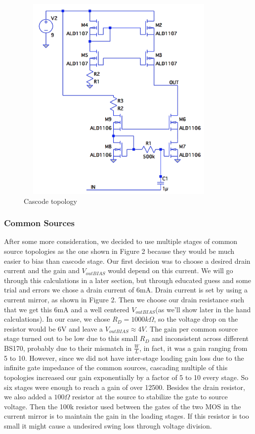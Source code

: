 \documentclass[11pt, twoside, letterpaper]{article}
\begin{document}
\begin{figure}[htbp]
\begin{center}
\includegraphics[width=4in,height=4in]{Cascode.png}
\caption{Cascode topology}
\end{center}
\end{figure}
\FloatBarrier

\subsubsection{Common Sources}
After some more consideration, we decided to use multiple stages of common source topologies as the one shown in Figure 2 because they would 
be much easier to bias than cascode stage. Our first decision was to choose a desired drain current and the gain and $V_{outBIAS}$
would depend on this current. We will go through this calculations in a later section, but through educated guess and some trial and errors we 
chose a drain current of 6mA. Drain current is set by using a current mirror, as shown in Figure 2. Then we choose our drain 
resistance such that we get this 6mA and a well centered $V_{outBIAS}$(as we'll show later in the hand calculations). In our case, we chose 
$R_D=1000k\Omega$, so the voltage drop on the resistor would be 6V and leave a $V_{outBIAS}\approx 4V$. The gain per common source stage turned 
out to be low due to this small $R_D$ and inconsistent across different BS170, probably due to their mismatch in $\frac{W}{L}$, in fact, it 
was a gain ranging from 5 to 10. However, since we did not have inter-stage loading gain loss due to the infinite gate impedance of the common 
sources, cascading multiple of this topologies increased our gain exponentially by a factor of 5 to 10 every stage. So six stages were enough 
to reach a gain of over 12500. Besides the drain resistor, we also added a $100\Omega$ resistor at the source to stabilize the gate to source voltage.
Then the 100k resistor used between the gates of the two MOS in the current mirror is to maintain the gain in the loading stages. If this resistor
is too small it might cause a undesired swing loss through voltage division.
\end{document}
